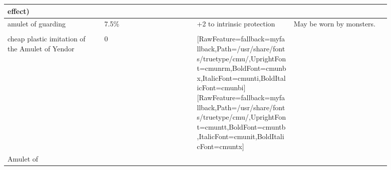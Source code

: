 {\begin{longtable}{|>{\RaggedRight}p{0.22474\linewidth}|>{\RaggedRight}p{0.21149\linewidth}|>{\RaggedRight}p{0.22474\linewidth}|>{\RaggedRight}p{0.22474\linewidth}|}
effect)}\allowbreak{}\setmainfont{cmunrm.ttf}[RawFeature={fallback=myfallback},Path=/usr/share/fonts/truetype/cmu/,UprightFont=cmunrm,BoldFont=cmunbx,ItalicFont=cmunti,BoldItalicFont=cmunbi]\setmonofont{cmunrm.ttf}[RawFeature={fallback=myfallback},Path=/usr/share/fonts/truetype/cmu/,UprightFont=cmuntt,BoldFont=cmuntb,ItalicFont=cmunit,BoldItalicFont=cmuntx]&\hspace*{0pt}\ignorespaces{}\hspace*{0pt}\\ \hline \hspace*{0pt}\ignorespaces{}\hspace*{0pt}amulet of guarding\footnotemark[52]&\hspace*{0pt}\ignorespaces{}\hspace*{0pt}7.5\%&\hspace*{0pt}\ignorespaces{}\hspace*{0pt}+2 to intrinsic protection\footnotemark[53]&\hspace*{0pt}\ignorespaces{}\hspace*{0pt}May be worn by monsters.\\ \hline \multicolumn{3}{|>{\RaggedRight}p{0.70228\linewidth}|}{\hspace*{0pt}\ignorespaces{}\hspace*{0pt}}\\ \hline \hspace*{0pt}\ignorespaces{}\hspace*{0pt}cheap plastic imitation of the Amulet of Yendor\footnotemark[54]&\hspace*{0pt}\ignorespaces{}\hspace*{0pt}0&\hspace*{0pt}\ignorespaces{}\hspace*{0pt}{\itshape \allowbreak{}\setmainfont{cmunti.ttf}[RawFeature={fallback=myfallback},Path=/usr/share/fonts/truetype/cmu/,UprightFont=cmunrm,BoldFont=cmunbx,ItalicFont=cmunti,BoldItalicFont=cmunbi]\setmonofont{cmunti.ttf}[RawFeature={fallback=myfallback},Path=/usr/share/fonts/truetype/cmu/,UprightFont=cmuntt,BoldFont=cmuntb,ItalicFont=cmunit,BoldItalicFont=cmuntx]\itshape (inedible)}\allowbreak{}\setmainfont{cmunrm.ttf}[RawFeature={fallback=myfallback},Path=/usr/share/fonts/truetype/cmu/,UprightFont=cmunrm,BoldFont=cmunbx,ItalicFont=cmunti,BoldItalicFont=cmunbi]\setmonofont{cmunrm.ttf}[RawFeature={fallback=myfallback},Path=/usr/share/fonts/truetype/cmu/,UprightFont=cmuntt,BoldFont=cmuntb,ItalicFont=cmunit,BoldItalicFont=cmuntx]&\hspace*{0pt}\ignorespaces{}\hspace*{0pt}\\ \hline \hspace*{0pt}\ignorespaces{}\hspace*{0pt}Amulet of 
\end{longtable}}

